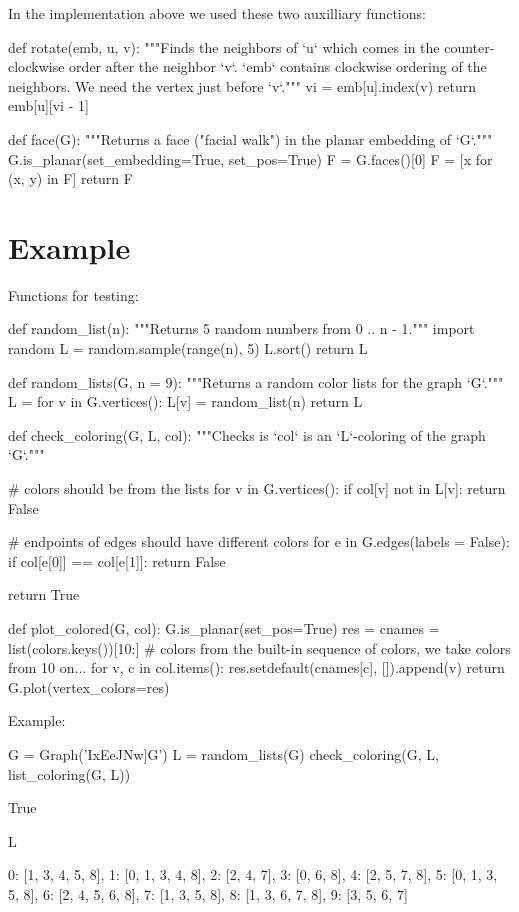 In the implementation above we used these two auxilliary functions:
\begin{sageCell}
def rotate(emb, u, v):
    """Finds the neighbors of `u` which comes in the counter-clockwise order
    after the neighbor `v`.
    `emb` contains clockwise ordering of the neighbors. We need
    the vertex just before `v`."""
    vi = emb[u].index(v)
    return emb[u][vi - 1]

def face(G):
    """Returns a face ("facial walk") in the planar embedding of `G`."""
    G.is_planar(set_embedding=True, set_pos=True)
    F = G.faces()[0]
    F = [x for (x, y) in F]
    return F
\end{sageCell}


\section{Example}

Functions for testing:
\begin{sageCell}
def random_list(n):
    """Returns 5 random numbers from 0 .. n - 1."""
    import random
    L = random.sample(range(n), 5)
    L.sort()
    return L

def random_lists(G, n = 9):
    """Returns a random color lists for the graph `G`."""
    L = {}
    for v in G.vertices():
        L[v] = random_list(n)
    return L

    def check_coloring(G, L, col):
    """Checks is `col` is an `L`-coloring of the graph `G`."""

    # colors should be from the lists
    for v in G.vertices():
        if col[v] not in L[v]:
            return False

    # endpoints of edges should have different colors
    for e in G.edges(labels = False):
        if col[e[0]] == col[e[1]]:
            return False

    return True

def plot_colored(G, col):
    G.is_planar(set_pos=True)
    res = {}
    cnames = list(colors.keys())[10:]  # colors from the built-in sequence of colors, we take colors from 10 on...
    for v, c in col.items():
        res.setdefault(cnames[c], []).append(v)
    return G.plot(vertex_colors=res)
\end{sageCell}

Example:
\begin{sageCell}
    G = Graph('IxEeJNw]G')
    L = random_lists(G)
    check_coloring(G, L, list_coloring(G, L))
\end{sageCell}
\begin{outCell}
    True
\end{outCell}
\begin{sageCell}
    L
\end{sageCell}
\begin{outCell}
    {0: [1, 3, 4, 5, 8],
     1: [0, 1, 3, 4, 8],
     2: [2, 4, 7],
     3: [0, 6, 8],
     4: [2, 5, 7, 8],
     5: [0, 1, 3, 5, 8],
     6: [2, 4, 5, 6, 8],
     7: [1, 3, 5, 8],
     8: [1, 3, 6, 7, 8],
     9: [3, 5, 6, 7]}
\end{outCell}

